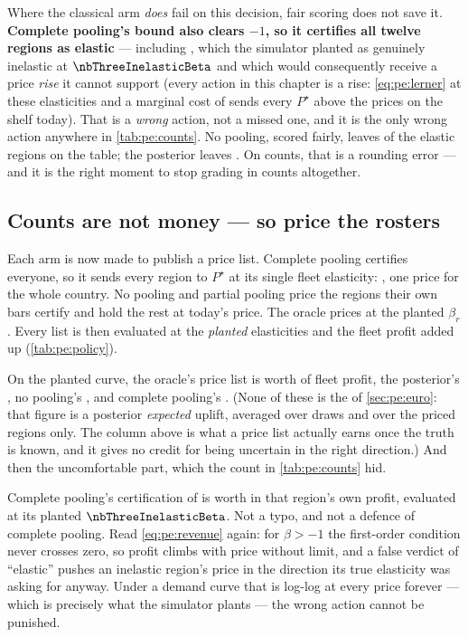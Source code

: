 Where the classical arm \emph{does} fail on this decision, fair scoring does not save it.
\textbf{Complete pooling's bound also clears $-1$, so it certifies all twelve regions as elastic}
--- including \nbThreeInelasticRegion, which the simulator planted as genuinely inelastic at
$\nbThreeInelasticBeta$ and which would consequently receive a price \emph{rise} it cannot support
(every action in this chapter is a rise: \cref{eq:pe:lerner} at these elasticities and a marginal
cost of \eur{\nbThreeMarginalCost} sends every $P^\star$ above the prices on the shelf today). That
is a \emph{wrong} action, not a missed one, and it is the only wrong action anywhere in
\cref{tab:pe:counts}. No pooling, scored fairly, leaves \nbThreeActNpMissed{} of the elastic
regions on the table; the posterior leaves \nbThreeActPpMissed. On counts, that is a rounding
error --- and it is the right moment to stop grading in counts altogether.

\subsection*{Counts are not money --- so price the rosters}

Each arm is now made to publish a price list. Complete pooling certifies everyone, so it sends every
region to $P^\star$ at its single fleet elasticity: \eur{\nbThreeCpPstar}, one price for the whole
country. No pooling and partial pooling price the regions their own bars certify and hold the rest
at today's price. The oracle prices at the planted $\beta_r$. Every list is then evaluated at the
\emph{planted} elasticities and the fleet profit added up (\cref{tab:pe:policy}).



On the planted curve, the oracle's price list is worth \pc{\nbThreePolicyValueOracle} of fleet
profit, the posterior's \pc{\nbThreePolicyValuePp}, no pooling's \pc{\nbThreePolicyValueNp}, and
complete pooling's \pc{\nbThreePolicyValueCp}. (None of these is the
\pc{\nbThreeFleetUplift} of \cref{sec:pe:euro}: that figure is a posterior \emph{expected} uplift,
averaged over draws and over the priced regions only. The column above is what a price list actually
earns once the truth is known, and it gives no credit for being uncertain in the right direction.)
And then the uncomfortable part, which the count in \cref{tab:pe:counts} hid.

\begin{remark}
Complete pooling's certification of \nbThreeInelasticRegion{} is worth
\pc{\nbThreeCpWrongGain} in that region's own profit, evaluated at its planted
$\nbThreeInelasticBeta$. Not a typo, and not a defence of complete pooling. Read
\cref{eq:pe:revenue} again: for $\beta > -1$ the first-order condition never crosses zero, so profit
climbs with price without limit, and a false verdict of ``elastic'' pushes an inelastic region's
price in the direction its true elasticity was asking for anyway. Under a demand curve that is
log-log at every price forever --- which is precisely what the simulator plants --- the wrong action
cannot be punished.
\end{remark}

